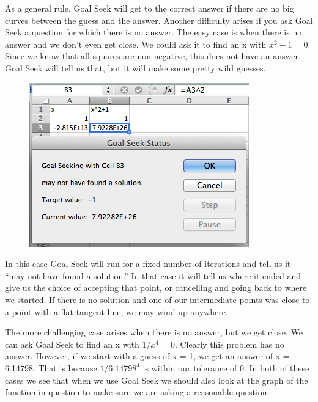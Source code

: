 \documentclass[10pt,]{book}
\theoremstyle{plain}
\theoremstyle{definition}
\theoremstyle{definition}
\begin{document}
As a general rule, Goal Seek will get to the correct answer if there are no big curves between the guess and the answer.
Another difficulty arises if you ask Goal Seek a question for which there is no answer.  The easy case is when there is no answer and we don't even get close.  We could ask it to find an x with \(x^2-1=0\).  Since we know that all squares are non-negative, this does not have an answer.  Goal Seek will tell us that, but it will make some pretty wild guesses.

  \leavevmode%
\begin{figure}
\centering
\includegraphics[width=0.8\linewidth]{images/sec1-6-14.png}
\end{figure}
 

%
\par

In this case Goal Seek will run for a fixed number of iterations and tell us it “may not have found a solution.”  In that case it will tell us where it ended and give us the choice of accepting that point, or cancelling and going back to where we started.  If there is no solution and one of our intermediate points was close to a point with a flat tangent line, we may wind up anywhere.%
\par
The more challenging case arises when there is no answer, but we get close.  We can ask Goal Seek to find an x with \(1/x^4 = 0\).  Clearly this problem has no answer.  However, if we start with a guess of x = 1, we get an answer of x = 6.14798.  That is because \(1/6.14798^4\) is within our tolerance of 0.  In both of these cases we see that when we use Goal Seek we should also look at the graph of the function in question to make sure we are asking a reasonable question.
\end{document}
